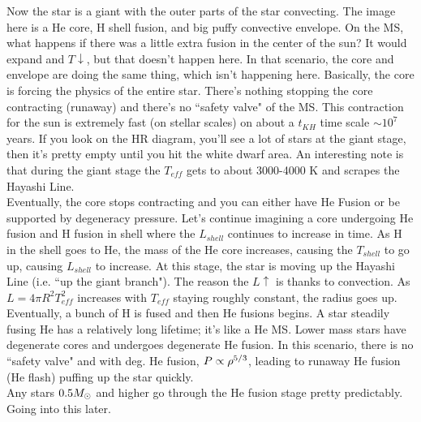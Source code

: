 Now the star is a giant with the outer parts of the star convecting. The image here is a He core, H shell fusion, and big puffy convective envelope. On the MS, what happens if there was a little extra fusion in the center of the sun? It would expand and $T \downarrow$, but that doesn't happen here. In that scenario, the core and envelope are doing the same thing, which isn't happening here. Basically, the core is forcing the physics of the entire star. There's nothing stopping the core contracting (runaway) and there's no ``safety valve" of the MS. This contraction for the sun is extremely fast (on stellar scales) on about a $t_{KH}$ time scale $\sim 10^7$ years. If you look on the HR diagram, you'll see a lot of stars at the giant stage, then it's pretty empty until you hit the white dwarf area. An interesting note is that during the giant stage the $T_{eff}$ gets to about 3000-4000 K and scrapes the Hayashi Line.\\

Eventually, the core stops contracting and you can either have He Fusion or be supported by degeneracy pressure. Let's continue imagining a core undergoing He fusion and H fusion in shell where the $L_{shell}$ continues to increase in time. As H in the shell goes to He, the mass of the He core increases, causing the $T_{shell}$ to go up, causing $L_{shell}$ to increase. At this stage, the star is moving up the Hayashi Line (i.e. ``up the giant branch"). The reason the $L \uparrow$ is thanks to convection. As $L = 4 \pi R^2T_{eff}^2$ increases with $T_{eff}$ staying roughly constant, the radius goes up. Eventually, a bunch of H is fused and then He fusions begins. A star steadily fusing He has a relatively long lifetime; it's like a He MS. Lower mass stars have degenerate cores and undergoes degenerate He fusion. In this scenario, there is no ``safety valve" and with deg. He fusion, $P \propto \rho^{5/3}$, leading to runaway He fusion (He flash) puffing up the star quickly. \\

Any stars $0.5 M_\odot$ and higher go through the He fusion stage pretty predictably. Going into this later. 
